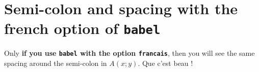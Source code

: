 \documentclass[12pt,a4paper]{article}
\theoremstyle{definition}
\begin{document}
\section{Semi-colon and spacing with the french option of \texttt{babel}}

\begin{tcblisting}{}
Only \textbf{if you use \texttt{babel} with the option \texttt{francais}}, then
you will see the same spacing around the semi-colon in $A(x;y)$. Que c'est beau !
\end{tcblisting}
\end{document}
